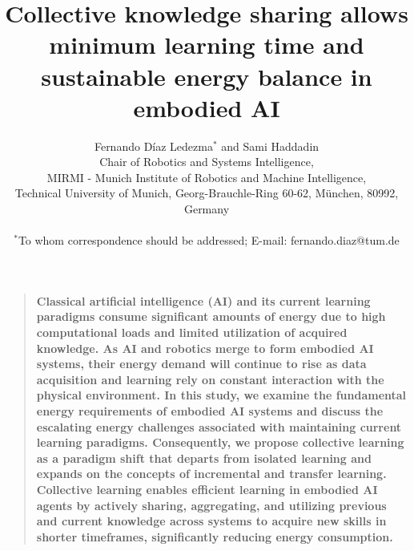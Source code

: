 \documentclass[12pt]{article}
\title{Collective knowledge sharing allows minimum learning time and sustainable energy balance in embodied AI}
\author
{Fernando D\'iaz Ledezma$^{\ast}$ and Sami Haddadin
\\
\normalsize{Chair of Robotics and Systems Intelligence,}\\
\normalsize{MIRMI - Munich Institute of Robotics and Machine Intelligence,}\\
\normalsize{Technical University of Munich, Georg-Brauchle-Ring 60-62, M\"unchen, 80992, Germany}\\
\\
\normalsize{$^\ast$To whom correspondence should be addressed; E-mail: fernando.diaz@tum.de}
}
\date{}
\newenvironment{sciabstract}{%
\begin{quote} \bf}
{\end{quote}}
\begin{document}
 

\baselineskip24pt


\maketitle 



\begin{sciabstract}
	Classical artificial intelligence (AI) and its current learning paradigms consume significant amounts of energy due to high computational loads and limited utilization of acquired knowledge. As AI and robotics merge to form embodied AI systems, their energy demand will continue to rise as data acquisition and learning rely on constant interaction with the physical environment. In this study, we examine the fundamental energy requirements of embodied AI systems and discuss the escalating energy challenges associated with maintaining current learning paradigms. Consequently, we propose collective learning as a paradigm shift that departs from isolated learning and expands on the concepts of incremental and transfer learning. Collective learning enables efficient learning in embodied AI agents by actively sharing, aggregating, and utilizing previous and current knowledge across systems to acquire new skills in shorter timeframes, significantly reducing energy consumption.
\end{sciabstract}

\end{document}

